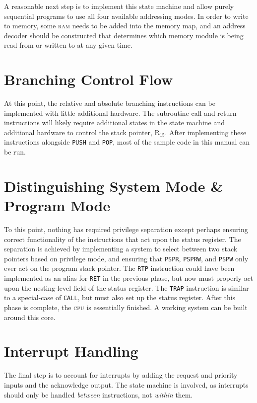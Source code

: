 \documentclass[12pt,english]{book}
\begin{document}
A reasonable next step is to implement this state machine
and allow purely sequential programs to use all four available
addressing modes.
In order to write to memory,
some \textsc{ram} needs to be added
into the memory map,
and an address decoder should be constructed
that determines which memory module is being
read from or written to at any given time.

\section{Branching Control Flow}
At this point, the relative and absolute branching instructions
can be implemented with little additional hardware.
The subroutine call and return instructions
will likely require additional states in the state machine
and additional hardware to control the stack pointer, \(\text{R}_{15}\).
After implementing these instructions
alongside \texttt{PUSH} and \texttt{POP},
most of the sample code in this manual can be run.

\section{Distinguishing System Mode \& Program Mode}
To this point, nothing has required privilege separation
except perhaps ensuring correct functionality
of the instructions that act upon the status register.
The separation is achieved by implementing a system
to select between two stack pointers based on privilege mode,
and ensuring that \texttt{PSPR}, \texttt{PSPRW}, and \texttt{PSPW}
only ever act on the program stack pointer.
The \texttt{RTP} instruction could have been implemented
as an alias for \texttt{RET} in the previous phase,
but now must properly act upon the nesting-level field
of the status register.
The \texttt{TRAP} instruction is similar
to a special-case of \texttt{CALL},
but must also set up the status register.
After this phase is complete,
the \textsc{cpu} is essentially finished.
A working system can be built around this core.

\section{Interrupt Handling}
The final step is to account for interrupts
by adding the request and priority inputs
and the acknowledge output.
The state machine is involved,
as interrupts should only be handled \emph{between} instructions,
not \emph{within} them.
\end{document}
